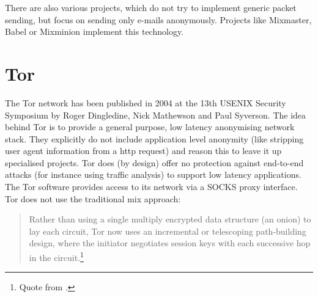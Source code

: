 There are also various projects, which do not try to implement
generic packet sending, but focus on sending only e-mails anonymously.
Projects like Mixmaster\cite{mixmaster}, 
Babel\cite{babel} or Mixminion\cite{mixminion} implement
this technology.
\section{Tor}
The Tor network has been published in 2004
at the 13th USENIX Security Symposium by Roger Dingledine, 
Nick Mathewson and Paul Syverson.\cite{tor}
The idea behind Tor is to provide a general purpose, 
low latency anonymising network stack.
They explicitly do not include application level anonymity
(like stripping user agent information from a http request) and
reason this to leave it up specialised projects.
Tor does (by design) offer no protection against end-to-end attacks
(for instance using traffic analysis) to support low latency applications.
The Tor software provides access to its network via
a SOCKS proxy interface.
Tor does not use the traditional mix approach:
\begin{quote}
Rather than using a single multiply encrypted
data structure (an onion) to lay each circuit, Tor now uses an
incremental or telescoping path-building design, where the
initiator negotiates session keys with each successive hop in
the circuit.\footnote{Quote from \cite{tor}.}
\end{quote}

